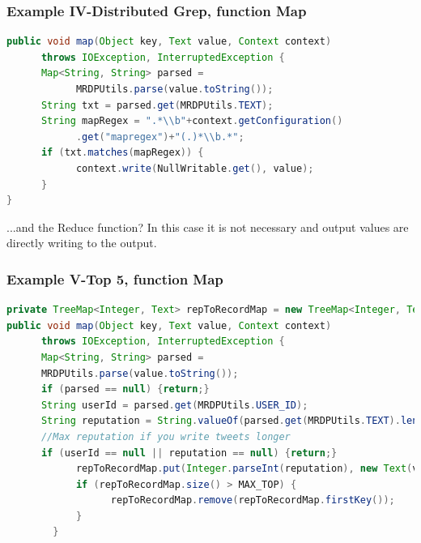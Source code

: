 \documentclass[xcolor=dvipsnames,dvip,notes=show,table]{beamer}
\begin{document}
\begin{frame}[fragile]
  \frametitle{Example IV-Distributed Grep, function Map}

\begin{lstlisting}[language=Java]
public void map(Object key, Text value, Context context)
      throws IOException, InterruptedException {
      Map<String, String> parsed = 
            MRDPUtils.parse(value.toString());
      String txt = parsed.get(MRDPUtils.TEXT);
      String mapRegex = ".*\\b"+context.getConfiguration()
            .get("mapregex")+"(.)*\\b.*";
      if (txt.matches(mapRegex)) {
            context.write(NullWritable.get(), value);
      }
}
\end{lstlisting}
\tiny

\begin{alertblock}{...and the Reduce function?}
 In this case it is not necessary and output values are directly writing to the output.
\end{alertblock}

\end{frame}







\begin{frame}[fragile]
  \frametitle{Example V-Top 5, function Map}

\begin{lstlisting}[language=Java]
private TreeMap<Integer, Text> repToRecordMap = new TreeMap<Integer, Text>();
public void map(Object key, Text value, Context context)
      throws IOException, InterruptedException {
      Map<String, String> parsed = 
      MRDPUtils.parse(value.toString());
      if (parsed == null) {return;}
      String userId = parsed.get(MRDPUtils.USER_ID);
      String reputation = String.valueOf(parsed.get(MRDPUtils.TEXT).length()); 
      //Max reputation if you write tweets longer
      if (userId == null || reputation == null) {return;}
            repToRecordMap.put(Integer.parseInt(reputation), new Text(value));
            if (repToRecordMap.size() > MAX_TOP) {
                  repToRecordMap.remove(repToRecordMap.firstKey());
            }
        }
\end{lstlisting}

\end{frame}
\end{document}
